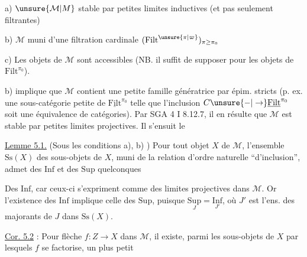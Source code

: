
a) $\unsure{\mathcal M|M}$ stable par petites limites inductives (et pas
seulement filtrantes)

b) $\mathcal M$  muni d'une
filtration cardinale $(\mathrm{Filt}^{\unsure{\pi|\varpi}})_{\pi\geq\pi_0}$

c) Les objets de $\mathcal M$ sont accessibles (NB. il suffit
de  supposer pour les objets de $\mathrm{Filt}^{\pi_0}$).

b) implique que $\mathcal M$ contient une petite
famille génératrice par épim. stricts (p. ex.
une sous-catégorie  petite de $\underline{\mathrm{Filt}}^{\pi_0}$  telle
que l'inclusion $C\unsure{-|\to}\underline{\mathrm{Filt}}^{\pi_0}$ soit une
équivalence de catégories). Par SGA 4 I 8.12.7,
il en résulte que $\mathcal M$ est stable par petites
limites projectives. Il s'ensuit le

\uline{Lemme 5.1.} (Sous les conditions a), b) ) Pour
tout objet $X$ de $\mathcal M$, l'ensemble $\mathrm{Ss}(X)$
des sous-objets de $X$, muni de la relation
d'ordre naturelle ``d'inclusion'', \deleted{\unsure{\}|;}} admet des
$\mathrm{Inf}$ et des $\mathrm{Sup}$ quelconques

Des $\mathrm{Inf}$, car ceux-ci s'expriment comme
des limites projectives dans $\mathcal M$. Or l'existence
des $\mathrm{Inf}$ implique celle des $\mathrm{Sup}$,
puisque $\underset{J}{\mathrm{Sup}}=\underset{J'}{\mathrm{Inf}}$, où $J'$ est l'ens.
des majorants de $J$ dans $\mathrm{Ss}(X)$.

\uline{Cor. 5.2} : Pour  flèche $f:Z\longrightarrow X$
dans $\mathcal M$, il existe, parmi les sous-objets  de $X$
par lesquels $f$ se factorise, un plus petit

